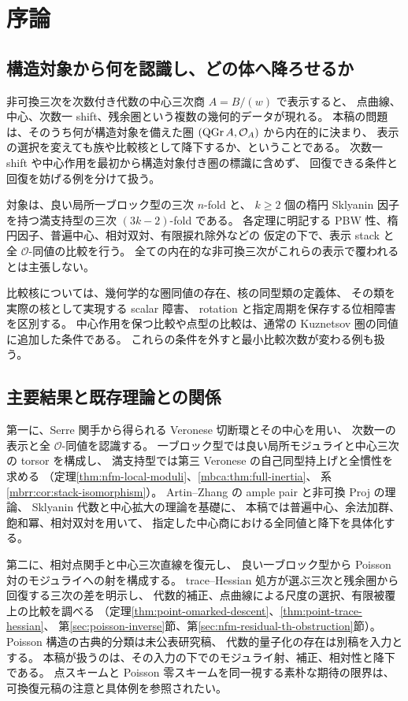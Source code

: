 \section{序論}
\label{sec:moduli-introduction}

\subsection{構造対象から何を認識し、どの体へ降ろせるか}

非可換三次を次数付き代数の中心三次商 $A=B/(w)$ で表示すると、
点曲線、中心、次数一 shift、残余圏という複数の幾何的データが現れる。
本稿の問題は、そのうち何が構造対象を備えた圏
$(\operatorname{QGr} A,\mathcal O_A)$ から内在的に決まり、
表示の選択を変えても族や比較核として降下するか、ということである。
次数一 shift や中心作用を最初から構造対象付き圏の標識に含めず、
回復できる条件と回復を妨げる例を分けて扱う。

対象は、良い局所一ブロック型の三次 $n$-fold と、
$k\ge2$ 個の楕円 Sklyanin 因子を持つ満支持型の三次 $(3k-2)$-fold である。
各定理に明記する PBW 性、楕円因子、普遍中心、相対双対、有限捩れ除外などの
仮定の下で、表示 stack と全 $\mathcal O$-同値の比較を行う。
全ての内在的な非可換三次がこれらの表示で覆われるとは主張しない。

比較核については、幾何学的な圏同値の存在、核の同型類の定義体、
その類を実際の核として実現する scalar 障害、
rotation と指定周期を保存する位相障害を区別する。
中心作用を保つ比較や点型の比較は、通常の Kuznetsov 圏の同値に追加した条件である。
これらの条件を外すと最小比較次数が変わる例も扱う。

\subsection{主要結果と既存理論との関係}

第一に、Serre 関手から得られる Veronese 切断環とその中心を用い、
次数一の表示と全 $\mathcal O$-同値を認識する。
一ブロック型では良い局所モジュライと中心三次の torsor を構成し、
満支持型では第三 Veronese の自己同型持上げと全慣性を求める
（定理\ref{thm:nfm-local-moduli}、\ref{mbca:thm:full-inertia}、
系\ref{mbrr:cor:stack-isomorphism}）。
Artin--Zhang の ample pair と非可換 Proj の理論\cite{LP-AZ}、
Sklyanin 代数と中心拡大の理論\cite{GRSklyaninATV,LBSV}を基礎に、
本稿では普遍中心、余法加群、飽和冪、相対双対を用いて、
指定した中心商における全同値と降下を具体化する。

第二に、相対点関手と中心三次直線を復元し、
良い一ブロック型から Poisson 対のモジュライへの射を構成する。
trace--Hessian 処方が選ぶ三次と残余圏から回復する三次の差を明示し、
代数的補正、点曲線による尺度の選択、有限被覆上の比較を調べる
（定理\ref{thm:point-omarked-descent}、\ref{thm:point-trace-hessian}、
第\ref{sec:poisson-inverse}節、第\ref{sec:nfm-residual-th-obstruction}節）。
Poisson 構造の古典的分類は未公表研究稿\cite{NCCubicA}、
代数的量子化の存在は別稿\cite{CubicQuantization}を入力とする。
本稿が扱うのは、その入力の下でのモジュライ射、補正、相対性と降下である。
点スキームと Poisson 零スキームを同一視する素朴な期待の限界は、
可換復元稿の注意と具体例を参照されたい。

